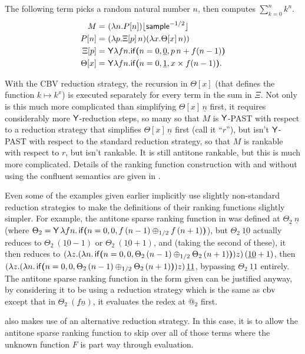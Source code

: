 \begin{example} \label{ex:sum of powers}
The following term picks a random natural number $n$, then computes $\sum_{k=0}^n k^n$.
\begin{align*}
M =&\ (\lambda n. P[n]) \lfloor \mathsf{sample}^{-1/2} \rfloor \\
P[n] =&\ (\lambda p. \Xi[p] \, n) (\lambda x. \Theta[x] \, n)) \\
\Xi[p] =&\ \mathsf{Y} \lambda f n. \mathsf{if}\boldsymbol{(}n = 0, \underline 0, p \, n + f (n-1)\boldsymbol{)} \\
\Theta[x] =&\ \mathsf{Y} \lambda f n. \mathsf{if}\boldsymbol{(}n = 0, \underline 1, x \times f (n-1)\boldsymbol{)}.
\end{align*}

With the CBV reduction strategy, the recursion in $\Theta[x]$ (that defines the function $k \mapsto k^x$) is executed separately for every term in the sum in $\Xi$. Not only is this much more complicated than simplifying $\Theta[x] \, \underline n$ first, it requires considerably more $\mathsf{Y}$-reduction steps, so many so that $M$ is $\mathsf{Y}$-PAST with respect to a reduction strategy that simplifies $\Theta[x] \, \underline n$ first (call it ``$r$''), but isn't $\mathsf{Y}$-PAST with respect to the standard reduction strategy, so that $M$ is rankable with respect to $r$, but isn't rankable. It is still antitone rankable, but this is much more complicated. Details of the ranking function construction with and without using the confluent semantics are given in .
\end{example}

Even some of the examples given earlier implicitly use slightly non-standard reduction strategies to make the definitions of their ranking functions slightly simpler. For example, the antitone sparse ranking function in  was defined at $\Theta_2\ \underline n$ (where $\Theta_2 = \mathsf{Y} \, \lambda f n . \, \mathsf{if}\boldsymbol{(}n = 0, 0, f \, (n - 1) \oplus_{1/2} f \, (n + 1)\boldsymbol{)}$), but $\Theta_2\ \underline{10}$ actually reduces to $\Theta_2\ (\underline{10} - 1)$ or $\Theta_2\ (\underline{10} + 1)$, and (taking the second of these), it then reduces to $(\lambda z. (\lambda n. \, \mathsf{if}\boldsymbol{(}n = 0, 0, \Theta_2 \, (n - 1) \oplus_{1/2} \Theta_2 \, (n + 1)\boldsymbol{)}) z) \, (\underline{10} + 1)$, then $(\lambda z. (\lambda n. \, \mathsf{if}\boldsymbol{(}n = 0, 0, \Theta_2 \, (n - 1) \oplus_{1/2} \Theta_2 \, (n + 1)\boldsymbol{)}) z) \, \underline{11}$, bypassing $\Theta_2\ \underline{11}$ entirely. The antitone sparse ranking function in the form given can be justified anyway, by considering it to be using a reduction strategy which is the same as $\operatorname{cbv}$ except that in $\Theta_2\ (\underline f \underline n)$, it evaluates the redex at $@_2$ first.

 also makes use of an alternative reduction strategy. In this case, it is to allow the antitone sparse ranking function to skip over all of those terms where the unknown function $F$ is part way through evaluation.
